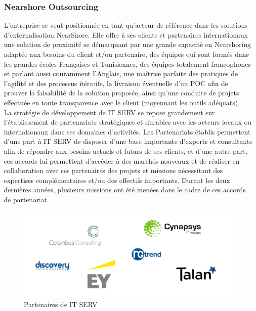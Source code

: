 \begin{spacing}{1.5}
\subsubsection*{Nearshore Outsourcing} %
L'entreprise se veut positionnée en tant qu’acteur de référence dans les solutions d’externalisation NearShore. Elle offre à ses clients et partenaires internationaux une solution de proximité se démarquant par une grande capacité en Nearshoring adaptée aux besoins du client et/ou partenaire, des équipes qui sont formés dans les grandes écoles Françaises et Tunisiennes, des équipes totalement francophones et parlant aussi couramment l’Anglais, une maîtrise parfaite des pratiques de l’agilité et des processus itératifs, la livraison éventuelle d’un POC afin de prouver la faisabilité de la solution proposée, ainsi qu'une conduite de projets effectuée en toute transparence avec le client (moyennant les outils adéquats).
\\

La stratégie de développement de IT SERV se repose grandement sur l’établissement de partenariats stratégiques et durables avec les acteurs locaux ou internationaux dans ses domaines d’activités. Les Partenariats établis permettent d’une part à IT SERV de disposer d’une base importante d’experts et consultants afin de répondre aux besoins actuels et futurs de ses clients, et d’une autre part, ces accords lui permettent d’accéder à des marchés nouveaux et de réaliser en collaboration avec ses partenaires des projets et missions nécessitant des expertises complémentaires et/ou des effectifs importants.
Durant les deux dernières années, plusieurs missions ont été menées dans le cadre de ces accords de partenariat.

\begin{figure}[!ht]
\centering
\includegraphics[scale=0.8]{partenaires.png}
\caption{Partenaires de IT SERV}
\label{fig:partenaires}
\end{figure}
\


\end{spacing}
